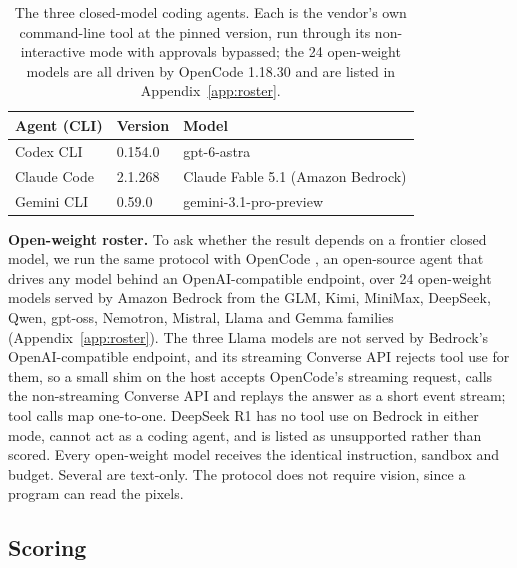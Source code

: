 \begin{table}[H]
\centering
\small
\setlength{\tabcolsep}{5pt}
\caption{The three closed-model coding agents. Each is the vendor's own command-line tool at the pinned version, run through its non-interactive mode with approvals bypassed; the 24 open-weight models are all driven by OpenCode 1.18.30 and are listed in Appendix~\ref{app:roster}.}
\label{tab:agents}
\begin{tabular}{lll}
\toprule
\textbf{Agent (CLI)} & \textbf{Version} & \textbf{Model} \\
\midrule
Codex CLI \citep{codexcli} & 0.154.0 & gpt-6-astra \\
Claude Code \citep{claudecode} & 2.1.268 & Claude Fable 5.1 (Amazon Bedrock) \\
Gemini CLI \citep{geminicli} & 0.59.0 & gemini-3.1-pro-preview \\
\bottomrule
\end{tabular}
\end{table}

\textbf{Open-weight roster.} To ask whether the result depends on a frontier closed model, we run the same protocol with OpenCode \citep{opencode}, an open-source agent that drives any model behind an OpenAI-compatible endpoint, over 24 open-weight models served by Amazon Bedrock from the GLM, Kimi, MiniMax, DeepSeek, Qwen, gpt-oss, Nemotron, Mistral, Llama and Gemma families (Appendix~\ref{app:roster}). The three Llama models are not served by Bedrock's OpenAI-compatible endpoint, and its streaming Converse API rejects tool use for them, so a small shim on the host accepts OpenCode's streaming request, calls the non-streaming Converse API and replays the answer as a short event stream; tool calls map one-to-one. DeepSeek R1 has no tool use on Bedrock in either mode, cannot act as a coding agent, and is listed as unsupported rather than scored. Every open-weight model receives the identical instruction, sandbox and budget. Several are text-only. The protocol does not require vision, since a program can read the pixels.

\subsection{Scoring}
\label{sec:scoring}

